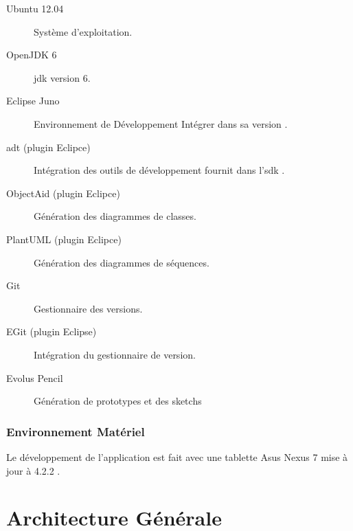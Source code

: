\begin{description}

\item [Ubuntu 12.04] Système d'exploitation.\footnotemark[1]

\item [OpenJDK 6] \gls{jdk} version 6.\footnotemark[2]

\item [Eclipse Juno] Environnement de Développement Intégrer dans sa version .\footnotemark[3]

\item [\gls{adt} (plugin Eclipce)] Intégration des outils de développement fournit dans l'\gls{sdk} \android{}.\footnotemark[4]

\item [ObjectAid (plugin Eclipce)] Génération des diagrammes de classes.\footnotemark[5]

\item [PlantUML (plugin Eclipce)] Génération des diagrammes de séquences.\footnotemark[6]

\item [Git] Gestionnaire des versions\footnotemark[7].

\item [EGit (plugin Eclipse)] Intégration du gestionnaire de version.\footnotemark[8]

\item [Evolus Pencil] Génération de prototypes et des sketchs\footnotemark[9]
\end{description}


\subsubsection{Environnement Matériel}
Le développement de l'application est fait avec une tablette Asus Nexus 7 mise à jour à \android{} 4.2.2 .

\section{Architecture Générale}

